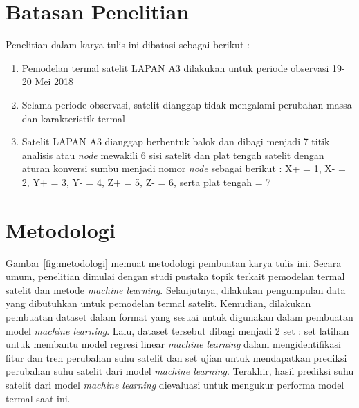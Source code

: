 \section{Batasan Penelitian}

Penelitian dalam karya tulis ini dibatasi sebagai berikut :

\begin{enumerate}
\item Pemodelan termal satelit LAPAN A3 dilakukan untuk periode observasi 19-20 Mei 2018
\item Selama periode observasi, satelit dianggap tidak mengalami perubahan massa dan karakteristik termal
\item Satelit LAPAN A3 dianggap berbentuk balok dan dibagi menjadi 7 titik
	analisis atau \textit{node} mewakili 6 sisi satelit dan plat tengah satelit dengan
		aturan konversi sumbu menjadi nomor \textit{node} sebagai berikut : X+ = 1, X- = 2,
		Y+ = 3, Y- = 4, Z+ = 5, Z- = 6, serta plat tengah = 7
\end{enumerate}

\section{Metodologi}

Gambar \ref{fig:metodologi} memuat metodologi pembuatan karya tulis ini. Secara
umum, penelitian dimulai dengan studi pustaka topik terkait pemodelan termal
satelit dan metode \textit{machine learning}. Selanjutnya, dilakukan
pengumpulan data yang dibutuhkan untuk pemodelan termal satelit. Kemudian,
dilakukan pembuatan dataset dalam format yang sesuai untuk digunakan dalam
pembuatan model \textit{machine learning}. Lalu, dataset tersebut dibagi
menjadi 2 set : set latihan untuk membantu model regresi linear \textit{machine
learning} dalam mengidentifikasi fitur dan tren perubahan suhu satelit dan set
ujian untuk mendapatkan prediksi perubahan suhu satelit dari model
\textit{machine learning}. Terakhir, hasil prediksi suhu satelit dari model
\textit{machine learning} dievaluasi untuk mengukur performa model termal saat ini.

